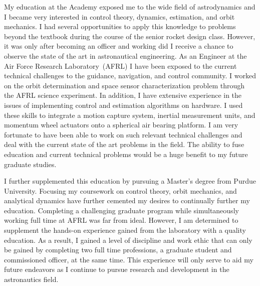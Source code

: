 \documentclass[12pt, oneside]{article}   	%
\begin{document}


My education at the Academy exposed me to the wide field of astrodynamics and I became very interested in control theory, dynamics, estimation, and orbit mechanics.
I had several opportunities to apply this knowledge to problems beyond the textbook during the course of the senior rocket design class.
However, it was only after becoming an officer and working did I receive a chance to observe the state of the art in astronautical engineering.
As an Engineer at the Air Force Research Laboratory~(AFRL) I have been exposed to the current technical challenges to the guidance, navigation, and control community.
I worked on the orbit determination and space sensor characterization problem through the AFRL science experiment.
In addition, I have extensive experience in the issues of implementing control and estimation algorithms on hardware.
I used these skills to integrate a motion capture system, inertial measurement units, and momentum wheel actuators onto a spherical air bearing platform.
I am very fortunate to have been able to work on such relevant technical challenges and deal with the current state of the art problems in the field. 
The ability to fuse education and current technical problems would be a huge benefit to my future graduate studies. 

I further supplemented this education by pursuing a Master's degree from Purdue University.
Focusing my coursework on control theory, orbit mechanics, and analytical dynamics have further cemented my desires to continually further my education.
Completing a challenging graduate program while simultaneously working full time at AFRL was far from ideal.
However, I am determined to supplement the hands-on experience gained from the laboratory with a quality education.
As a result, I gained a level of discipline and work ethic that can only be gained by completing two full time professions, a graduate student and commissioned officer, at the same time.
This experience will only serve to aid my future endeavors as I continue to pursue research and development in the astronautics field.
\end{document}
